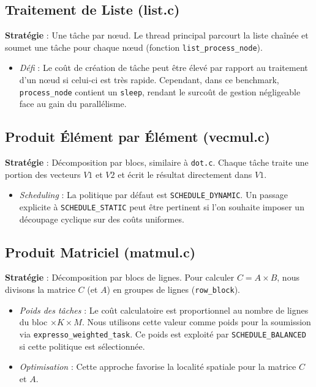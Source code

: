 \documentclass[a4paper,11pt]{article}
\begin{document}
\subsection{Traitement de Liste (list.c)}
\textbf{Stratégie} : Une tâche par nœud.
Le thread principal parcourt la liste chaînée et soumet une tâche pour chaque nœud (fonction \texttt{list\_process\_node}).
\begin{itemize}
    \item \textit{Défi} : Le coût de création de tâche peut être élevé par rapport au traitement d'un nœud si celui-ci est très rapide. Cependant, dans ce benchmark, \texttt{process\_node} contient un \texttt{sleep}, rendant le surcoût de gestion négligeable face au gain du parallélisme.
\end{itemize}

\subsection{Produit Élément par Élément (vecmul.c)}
\textbf{Stratégie} : Décomposition par blocs, similaire à \texttt{dot.c}.
Chaque tâche traite une portion des vecteurs $V1$ et $V2$ et écrit le résultat directement dans $V1$.
\begin{itemize}
    \item \textit{Scheduling} : La politique par défaut est \texttt{SCHEDULE\_DYNAMIC}. Un passage explicite à \texttt{SCHEDULE\_STATIC} peut être pertinent si l'on souhaite imposer un découpage cyclique sur des coûts uniformes.
\end{itemize}

\subsection{Produit Matriciel (matmul.c)}
\textbf{Stratégie} : Décomposition par blocs de lignes.
Pour calculer $C = A \times B$, nous divisons la matrice $C$ (et $A$) en groupes de lignes (\texttt{row\_block}).
\begin{itemize}
    \item \textit{Poids des tâches} : Le coût calculatoire est proportionnel au nombre de lignes du bloc $\times K \times M$. Nous utilisons cette valeur comme poids pour la soumission via \texttt{expresso\_weighted\_task}. Ce poids est exploité par \texttt{SCHEDULE\_BALANCED} si cette politique est sélectionnée.
    \item \textit{Optimisation} : Cette approche favorise la localité spatiale pour la matrice $C$ et $A$.
\end{itemize}
\end{document}
